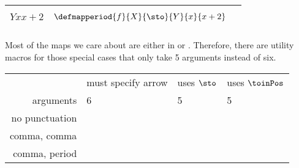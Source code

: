 \begin{widepar}
\begin{tabular}{|c|c|c|}
\begin{minipage}{0.3\textwidth}
\begin{equation}
{                }{
                    Y
                }{
                    x
                }{
                    x + 2
                }
            \end{equation}
        \end{minipage}
         &
        \begin{minipage}{0.3\textwidth}
            \begin{equation}
                \defmapperiod{
                    f
                }{
                    X
                }{
                    \sto
                }{
                    Y
                }{
                    x
                }{
                    x + 2
                }
            \end{equation}
        \end{minipage}
        \\\hline
    \end{tabular}
\end{widepar}
Most of the maps we care about are either in \Set or \Pos.
Therefore, there are utility macros for those special cases that only take 5 arguments instead of six.

\begin{widepar}
    \begin{tabular}{rlll}
                       & must specify arrow                           & uses $\sto$            & uses $\toinPos$ \\
        arguments      & 6                                            & 5                      & 5 \\
        no punctuation & \str{\defmap}       & \str{\defmapset}       & \str{\defmappos} \\
        comma, comma   & \str{\defmapcomma}  & \str{\defmapcommaset}  & \str{\defmapcommapos} \\
        comma, period  & \str{\defmapperiod} & \str{\defmapperiodset} & \str{\defmapperiodpos} \\
    \end{tabular}
\end{widepar}

